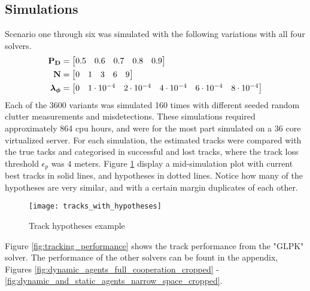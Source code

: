 \subsection{Simulations}
Scenario one through six was simulated with the following variations with all four solvers.
\begin{equation*}
\begin{split}
\boldsymbol{\mathbf{P_D}} &= \begin{bmatrix} 0.5 & 0.6 & 0.7 & 0.8 & 0.9 \end{bmatrix} \\
\boldsymbol{\mathbf{N}} &=\begin{bmatrix} 0 & 1 & 3 & 6 & 9 \end{bmatrix} \\
\boldsymbol{\mathbf{\lambda_\phi}} &=\begin{bmatrix} 0 & 1\cdot10^{-4} & 2\cdot10^{-4} & 4\cdot10^{-4} & 6\cdot10^{-4} & 8\cdot10^{-4} \end{bmatrix}
\end{split}
\end{equation*}
Each of the 3600 variants was simulated 160 times with different seeded random clutter measurements and misdetections. These simulations required approximately 864 \gls{cpu} hours, and were for the most part simulated on a 36 core virtualized server. For each simulation, the estimated tracks were compared with the true tacks and categorised in successful and lost tracks, where the track loss threshold $\epsilon_p$ was $4$ meters. Figure \ref{fig:track_hypotheses_example} display a mid-simulation plot with current best tracks in solid lines, and hypotheses in dotted lines. Notice how many of the hypotheses are very similar, and with a certain margin duplicates of each other.
\begin{figure}[H]
    \centering
    \texttt{[image: tracks\_with\_hypotheses]}
    \caption{Track hypotheses example}
    \label{fig:track_hypotheses_example}
\end{figure}
Figure \ref{fig:tracking_performance} shows the track performance from the "GLPK" solver. The performance of the other solvers can be fount in the appendix, Figures \ref{fig:dynamic_agents_full_cooperation_cropped} - \ref{fig:dynamic_and_static_agents_narrow_space_cropped}.

